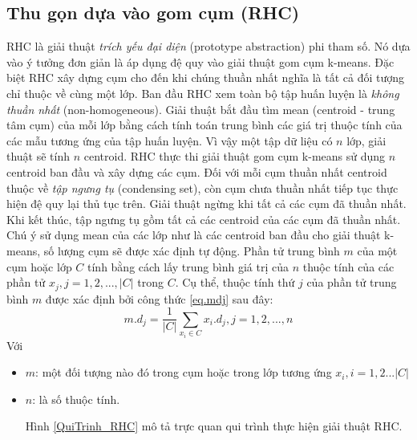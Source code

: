 \documentclass[13pt,oneside]{scrbook}
\begin{document}
\subsection{Thu gọn dựa vào gom cụm (RHC)}
RHC là giải thuật \textit{trích yếu đại diện} (prototype abstraction) phi tham số. 
Nó dựa vào ý tưởng đơn giản là áp dụng đệ quy vào giải thuật gom cụm k-means. 
Đặc biệt RHC xây dựng cụm cho đến khi chúng thuần nhất nghĩa là tất cả đối tượng chỉ thuộc về  cùng một lớp.
Ban đầu RHC xem toàn bộ tập huấn luyện là \textit{không thuần nhất} (non-homogeneous). 
Giải thuật bắt đầu tìm mean (centroid - trung tâm cụm) của mỗi lớp bằng cách tính toán trung bình các giá trị thuộc tính của các mẫu tương ứng của tập huấn luyện. 
Vì vậy một tập dữ liệu có $n$ lớp, giải thuật sẽ tính $n$ centroid. 
RHC thực thi giải thuật gom cụm k-means sử dụng $n$ centroid ban đầu và xây dựng các cụm. 
Đối với mỗi cụm thuần nhất centroid thuộc về \textit{tập ngưng tụ} (condensing set), còn cụm chưa thuần nhất tiếp tục thực hiện đệ quy lại thủ tục trên. 
Giải thuật ngừng khi tất cả các cụm đã thuần nhất. 
Khi kết thúc, tập ngưng tụ gồm tất cả các centroid của các cụm đã thuần nhất. 
Chú ý sử dụng mean của các lớp như là các centroid ban đầu cho giải thuật k-means, số lượng cụm sẽ được xác định tự động. 
Phần tử trung bình $m$ của một cụm hoặc lớp $C$ tính bằng cách lấy trung bình giá trị của $n$ thuộc tính của các phần tử $x_j, j = 1, 2,...,|C|$ trong $C$. Cụ thể, thuộc tính thứ $j$ của phần tử trung bình $m$ được xác định bởi công thức \ref{eq.mdj} sau đây:
\begin{equation}\label{eq.mdj}
m.{d_j} = \frac{1}{{\left| C \right|}}\sum\limits_{{x_i} \in C} {{x_i}.{d_j},j = 1,2,...,n} 
\end{equation}
Với
\begin{itemize}
\item $m$: một đối tượng nào đó trong cụm hoặc trong lớp tương ứng  $x_i, i= 1, 2. . .|C|$
\item $n$: là số thuộc tính.

\noindent Hình \ref{QuiTrinh_RHC} mô tả trực quan qui trình thực hiện giải thuật RHC.
\end{itemize}
\end{document}
